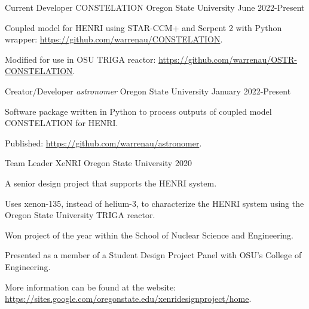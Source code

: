 
\begin{cventries}
  \cventry
    {Current Developer}      %
    {CONSTELATION}           %
    {Oregon State University}%
    {June 2022-Present}   %
    {
    \begin{cvitems}
        \item{Coupled model for HENRI using STAR-CCM+ and Serpent 2 with Python wrapper: \href{https://github.com/warrenau/CONSTELATION}{https://github.com/warrenau/CONSTELATION}.}
        \item{Modified for use in OSU TRIGA reactor: \href{https://github.com/warrenau/OSTR-CONSTELATION}{https://github.com/warrenau/OSTR-CONSTELATION}.}
    \end{cvitems}
    }


  \cventry
    {Creator/Developer}                %
    {\textit{astronomer}}             %
    {Oregon State University}%
    {January 2022-Present}   %
    {
    \begin{cvitems}
        \item{Software package written in Python to process outputs of coupled model CONSTELATION for HENRI.}
        \item{Published: \href{https://github.com/warrenau/astronomer}{https://github.com/warrenau/astronomer}.}
    \end{cvitems}
    }

  
  \cventry
    {Team Leader} %
    {XeNRI} %
    {Oregon State University} %
    {2020} %
    {
      \begin{cvitems} %
        \item{A senior design project that supports the HENRI system.}
		\item {Uses xenon-135, instead of helium-3, to characterize the HENRI system using the Oregon State University TRIGA reactor.}
		\item {Won project of the year within the School of Nuclear Science and Engineering.}
		\item{Presented as a member of a Student Design Project Panel with OSU's College of Engineering.}
        \item{More information can be found at the website: \href{https://sites.google.com/oregonstate.edu/xenridesignproject/home}{https://sites.google.com/oregonstate.edu/xenridesignproject/home}.}
      \end{cvitems}
    }



\end{cventries}
